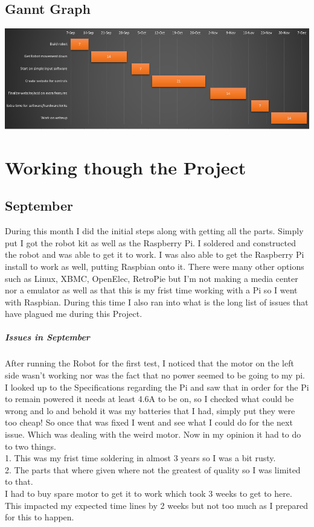 \documentclass[13ptletterpaper]{paper}
\newcommand\tab[1][1cm]{\hspace*{#1}}
\begin{document}
\begin{flushleft}
	\subsection{Gannt Graph}
	\includegraphics[scale=0.75]{Capture.png}
	\section{Working though the Project}
	\subsection{September}
	\tab During this month I did the initial steps along with getting all the parts. Simply put I got the robot kit as well as the Raspberry Pi. I soldered and constructed the robot and was able to get it to work. I was also able to get the Raspberry Pi install to work as well, putting Raspbian onto it. There were many other options such as Linux, XBMC, OpenElec, RetroPie but I'm not making a media center nor a emulator as well as that this is my frist time working with a Pi so I went with Raspbian. During this time I also ran into what is the long list of issues that have plagued me during this Project.
	\subparagraph{Issues in September} After running the Robot for the first test, I noticed that the motor on the left side wasn't working nor was the fact that no power seemed to be going to my pi. I looked up to the Specifications regarding the Pi and saw that in order for the Pi to remain powered it needs at least 4.6A to be on, so I checked what could be wrong and lo and behold it was my batteries that I had, simply put they were too cheap! So once that was fixed I went and see what I could do for the next issue. Which was dealing with the weird motor. Now in my opinion it had to do to two things. \\
	\tab 1. This was my frist time soldering in almost 3 years so I was a bit rusty.\\
	\tab 2. The parts that where given where not the greatest of quality so I was limited to that.\\
	I had to buy spare motor to get it to work which took 3 weeks to get to here. This impacted my expected time lines by 2 weeks but not too much as I prepared for this to happen. \\
	

\end{flushleft}
\end{document}
